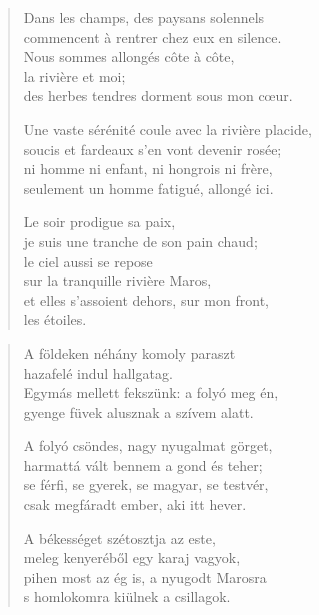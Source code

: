 \documentclass[11pt]{book}
\newcommand*{\centeredornament}{\centerline{\pgfornament[width=6cm]{88}}}
\begin{document}
\begin{verse}
  Dans les champs, des paysans solennels \\
  commencent à rentrer chez eux en silence. \\
  Nous sommes allongés côte à côte, \\
  la rivière et moi; \\
  des herbes tendres dorment sous mon cœur.

  Une vaste sérénité coule avec la rivière placide,\hspace*{-4mm} \\
  soucis et fardeaux s'en vont devenir rosée; \\
  ni homme ni enfant, ni hongrois ni frère, \\
  seulement un homme fatigué, allongé ici.

  Le soir prodigue sa paix, \\
  je suis une tranche de son pain chaud; \\
  le ciel aussi se repose \\
  sur la tranquille rivière Maros, \\
  et elles s'assoient dehors, sur mon front, \\
  les étoiles.
\end{verse}

\newpage

\vspace*{-15mm}
\centeredornament



\begin{verse}
  A földeken néhány komoly paraszt \\
  hazafelé indul hallgatag. \\
  Egymás mellett fekszünk: a folyó meg én, \\
  gyenge füvek alusznak a szívem alatt.

  A folyó csöndes, nagy nyugalmat görget, \\
  harmattá vált bennem a gond és teher; \\
  se férfi, se gyerek, se magyar, se testvér, \\
  csak megfáradt ember, aki itt hever.

  A békességet szétosztja az este, \\
  meleg kenyeréből egy karaj vagyok, \\
  pihen most az ég is, a nyugodt Marosra \\
  s homlokomra kiülnek a csillagok.
\end{verse}
\end{document}

